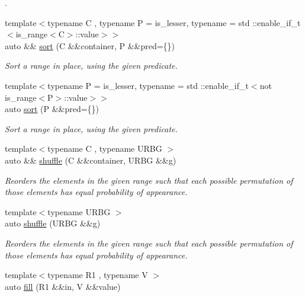\begin{DoxyCompactItemize}
\begin{DoxyCompactList}
. \end{DoxyCompactList}\item 
{\footnotesize template$<$typename C , typename P  = is\+\_\+lesser, typename  = std \+::enable\+\_\+if\+\_\+t$<$is\+\_\+range$<$\+C$>$\+::value$>$$>$ }\\auto \&\& \mbox{\hyperlink{namespacerah_1_1action_a2bddee3b65a2ecf86d2c3ac49bb41183}{sort}} (C \&\&container, P \&\&pred=\{\})
\begin{DoxyCompactList}\small\item\em Sort a range in place, using the given predicate. \end{DoxyCompactList}\item 
{\footnotesize template$<$typename P  = is\+\_\+lesser, typename  = std \+::enable\+\_\+if\+\_\+t$<$not is\+\_\+range$<$\+P$>$\+::value$>$$>$ }\\auto \mbox{\hyperlink{namespacerah_1_1action_ac1603fdf8fc87e84c277c216a5176674}{sort}} (P \&\&pred=\{\})
\begin{DoxyCompactList}\small\item\em Sort a range in place, using the given predicate. \end{DoxyCompactList}\item 
{\footnotesize template$<$typename C , typename U\+R\+BG $>$ }\\auto \&\& \mbox{\hyperlink{namespacerah_1_1action_ae775b99f4520e9cb7ef61acb3fccb1ca}{shuffle}} (C \&\&container, U\+R\+BG \&\&g)
\begin{DoxyCompactList}\small\item\em Reorders the elements in the given range such that each possible permutation of those elements has equal probability of appearance. \end{DoxyCompactList}\item 
{\footnotesize template$<$typename U\+R\+BG $>$ }\\auto \mbox{\hyperlink{namespacerah_1_1action_add6b8e704a8e603302290792a45a5c06}{shuffle}} (U\+R\+BG \&\&g)
\begin{DoxyCompactList}\small\item\em Reorders the elements in the given range such that each possible permutation of those elements has equal probability of appearance. \end{DoxyCompactList}\item 
{\footnotesize template$<$typename R1 , typename V $>$ }\\auto \mbox{\hyperlink{namespacerah_1_1action_afee3c0ce8604f13a4e8a6f1975d335f6}{fill}} (R1 \&\&in, V \&\&value)

\end{DoxyCompactItemize}
